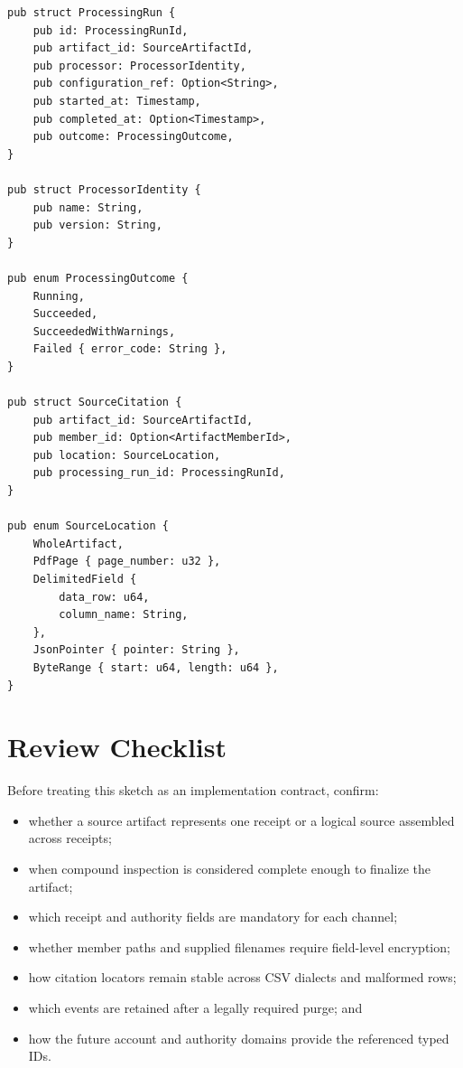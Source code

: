 \documentclass[11pt]{article}
\begin{document}
\begin{lstlisting}
pub struct ProcessingRun {
    pub id: ProcessingRunId,
    pub artifact_id: SourceArtifactId,
    pub processor: ProcessorIdentity,
    pub configuration_ref: Option<String>,
    pub started_at: Timestamp,
    pub completed_at: Option<Timestamp>,
    pub outcome: ProcessingOutcome,
}

pub struct ProcessorIdentity {
    pub name: String,
    pub version: String,
}

pub enum ProcessingOutcome {
    Running,
    Succeeded,
    SucceededWithWarnings,
    Failed { error_code: String },
}

pub struct SourceCitation {
    pub artifact_id: SourceArtifactId,
    pub member_id: Option<ArtifactMemberId>,
    pub location: SourceLocation,
    pub processing_run_id: ProcessingRunId,
}

pub enum SourceLocation {
    WholeArtifact,
    PdfPage { page_number: u32 },
    DelimitedField {
        data_row: u64,
        column_name: String,
    },
    JsonPointer { pointer: String },
    ByteRange { start: u64, length: u64 },
}
\end{lstlisting}

\newpage
\section{Review Checklist}

Before treating this sketch as an implementation contract, confirm:

\begin{itemize}
  \item whether a source artifact represents one receipt or a logical source assembled across receipts;
  \item when compound inspection is considered complete enough to finalize the artifact;
  \item which receipt and authority fields are mandatory for each channel;
  \item whether member paths and supplied filenames require field-level encryption;
  \item how citation locators remain stable across CSV dialects and malformed rows;
  \item which events are retained after a legally required purge; and
  \item how the future account and authority domains provide the referenced typed IDs.
\end{itemize}
\end{document}
